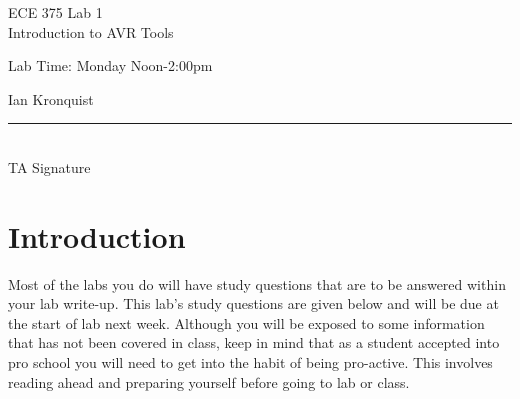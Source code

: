 \documentclass[12pt,letterpaper]{article}
\begin{document}
\begin{titlepage}
    \vspace*{4cm}
    \begin{flushright}
    {\huge
        ECE 375 Lab 1\\[1cm]
    }
    {\large
        Introduction to AVR Tools
    }
    \end{flushright}
    \begin{flushleft}
    Lab Time: Monday Noon-2:00pm
    \end{flushleft}
    \begin{flushright}
    Ian Kronquist
    \vfill
    \rule{5in}{.5mm}\\
    TA Signature
    \end{flushright}

\end{titlepage}

\section{Introduction}
Most of the labs you do will have study questions that are to be answered within your lab write-up.  This lab’s study questions are given below and will be due at the start of lab next week. Although you will be exposed to some information that has not been covered in class, keep in mind that as a student accepted into pro school you will need to get into the habit of being pro-active.  This involves reading ahead and preparing yourself before going to lab or class.  
\end{document}
